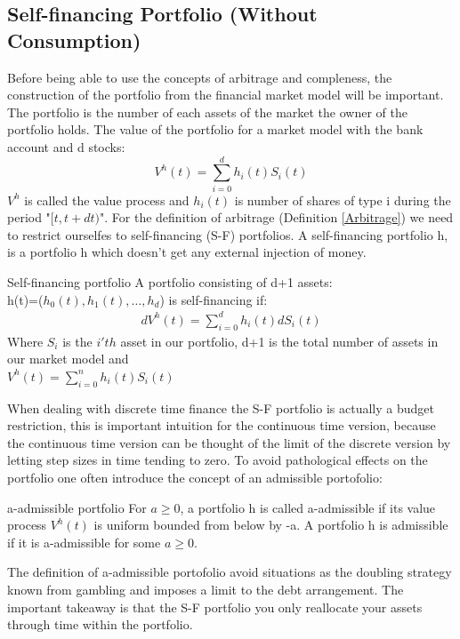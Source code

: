\subsection{Self-financing Portfolio (Without Consumption)}
Before being able to use the concepts of arbitrage and compleness, the construction of the portfolio from the financial market model will be important. The portfolio is the number of each assets of the market the owner of the portfolio holds. The value of the portfolio for a market model with the bank account and d stocks:
\begin{equation}
V^h(t)=\sum_{i=0}^{d} h_{i}(t) S_i(t)
\end{equation}
$V^h$ is called the value process and $h_i(t)$ is number of shares of type i during the period "$[t,t+dt)$". For the definition of arbitrage (Definition \ref{Arbitrage}) we need to restrict ourselfes to self-financing (S-F) portfolios. A self-financing portfolio h, is a portfolio h which doesn't get any external injection of money.
\theoremstyle{definition}
\begin{definition}{Self-financing portfolio}
A portfolio consisting of d+1 assets: \\
h(t)=($h_0(t),h_1(t), \dotsc, h_{d}$) is self-financing if:
\begin{equation}\label{SF}
\begin{split}
dV^{h}(t)=\sum_{i=0}^{d} h_{i}(t) dS_{i}(t)
\end{split}
\end{equation}
Where $S_{i}$ is the $i'th$ asset in our portfolio, d+1 is the total number of assets in our market model and\\
$V^{h}(t)=\sum_{i=0}^{n} h_{i}(t) S_{i}(t)$
\end{definition}
When dealing with discrete time finance the S-F portfolio is actually a budget restriction, this is important intuition for the continuous time version, because the continuous time version can be thought of the limit of the discrete version by letting step sizes in time tending to zero. To avoid pathological effects on the portfolio one often introduce the concept of an admissible portofolio:
\theoremstyle{definition}
\begin{definition}{a-admissible portfolio}
For $a\geq 0$, a portfolio h is called a-admissible if its value process $V^h(t)$ is uniform bounded from below by -a. A portfolio h is admissible if it is a-admissible for some $a\geq 0$.
\end{definition}
The definition of a-admissible portofolio avoid situations as the doubling strategy known from gambling and imposes a limit to the debt arrangement. The important takeaway is that the S-F portfolio you only reallocate your assets through time within the portfolio.


